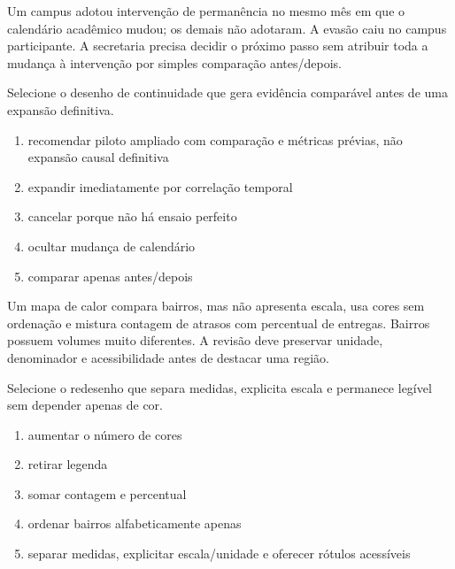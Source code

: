 
\TextoBase

Um campus adotou intervenção de permanência no mesmo mês em que o calendário acadêmico mudou; os demais não adotaram. A evasão caiu no campus participante. A secretaria precisa decidir o próximo passo sem atribuir toda a mudança à intervenção por simples comparação antes/depois.

\FonteDidatica

\Comando Selecione o desenho de continuidade que gera evidência comparável antes de uma expansão definitiva.

\begin{enumerate}[label=\Alph*)]

\item recomendar piloto ampliado com comparação e métricas prévias, não expansão causal definitiva

\item expandir imediatamente por correlação temporal

\item cancelar porque não há ensaio perfeito

\item ocultar mudança de calendário

\item comparar apenas antes/depois

\end{enumerate}


\TextoBase

Um mapa de calor compara bairros, mas não apresenta escala, usa cores sem ordenação e mistura contagem de atrasos com percentual de entregas. Bairros possuem volumes muito diferentes. A revisão deve preservar unidade, denominador e acessibilidade antes de destacar uma região.

\FonteDidatica

\Comando Selecione o redesenho que separa medidas, explicita escala e permanece legível sem depender apenas de cor.

\begin{enumerate}[label=\Alph*)]

\item aumentar o número de cores

\item retirar legenda

\item somar contagem e percentual

\item ordenar bairros alfabeticamente apenas

\item separar medidas, explicitar escala/unidade e oferecer rótulos acessíveis

\end{enumerate}


